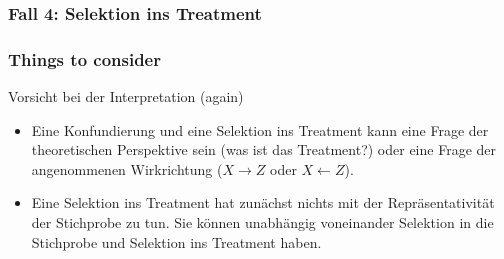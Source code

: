 \documentclass[18pt, aspectratio=169]{beamer}
\begin{document}
\begin{frame}
\frametitle{Fall 4: Selektion ins Treatment}

\begin{center}

\end{center}

\end{frame}

\begin{frame}
\frametitle{Things to consider}

\begin{block}{Vorsicht bei der Interpretation (again)}
\begin{itemize}
  \item Eine Konfundierung und eine Selektion ins Treatment kann eine Frage der theoretischen Perspektive sein (was ist das Treatment?) oder eine Frage der angenommenen Wirkrichtung ($X \rightarrow Z$ oder $X \leftarrow Z$). 
  \item Eine Selektion ins Treatment hat zunächst nichts mit der Repräsentativität der Stichprobe zu tun. Sie können unabhängig voneinander Selektion in die Stichprobe und Selektion ins Treatment haben. 
\end{itemize}
\end{block}

\end{frame}
\end{document}

